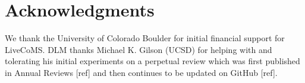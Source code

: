 \documentclass[9pt]{livecoms}
\begin{document}
\section{Acknowledgments}

We thank the University of Colorado Boulder for initial financial support for LiveCoMS. 
DLM thanks Michael K. Gilson (UCSD) for helping with and tolerating his initial experiments on a perpetual review which was first published in Annual Reviews [ref] and then continues to be updated on GitHub [ref].


\end{document}
